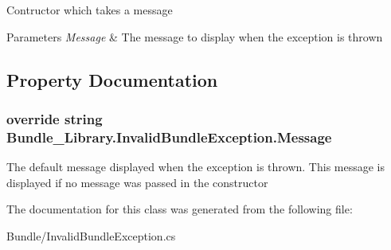 Contructor which takes a message 


\begin{DoxyParams}{Parameters}
{\em Message} & The message to display when the exception is thrown\\
\hline
\end{DoxyParams}


\subsection{Property Documentation}
\subsubsection[{Message}]{\setlength{\rightskip}{0pt plus 5cm}override string Bundle\+\_\+\+Library.\+Invalid\+Bundle\+Exception.\+Message\hspace{0.3cm}{\ttfamily [get]}}\label{class_bundle___library_1_1_invalid_bundle_exception_ad8726c1e618cb38e63240def5a57733e}


The default message displayed when the exception is thrown. This message is displayed if no message was passed in the constructor 



The documentation for this class was generated from the following file\+:\begin{DoxyCompactItemize}
\item 
Bundle/Invalid\+Bundle\+Exception.\+cs\end{DoxyCompactItemize}
